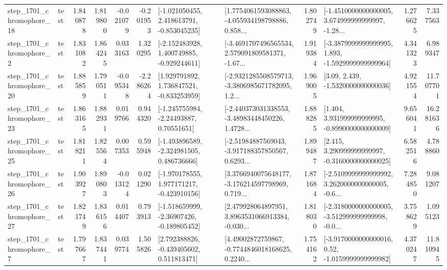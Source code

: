 \begin{tabular}{llrrrrllrlrr}
 step\_1701\_chromophore\_18 &      test &      1.840878 &    1.819800 &     -0.021079 & -0.201953 &   [-1.021050455, 2.418613791, -0.853045235] &  [1.7754061593088863, -4.055934198798886, 0.858... &       1.802749 &  [-1.4510000000000005, 3.674999999999997, -1.28... &            1.276625 &          7.337563 \\
  step\_1701\_chromophore\_2 &      test &      1.831082 &    1.864245 &      0.033163 &  1.320295 &   [-2.152483928, 1.400749885, -0.929244611] &  [-3.4691707496565534, 2.579091809581371, -1.67... &       1.919384 &  [-3.3879999999999995, 1.893, -1.5929999999999964] &            4.341323 &          6.989347 \\
 step\_1701\_chromophore\_20 &      test &      1.885859 &    1.790511 &     -0.095348 & -2.286264 &    [1.929791892, 1.736847521, -0.833253959] &  [-2.9321285508579713, -3.3806985671782095, 1.2... &       1.969005 &                 [3.09, 2.439, -1.5320000000000036] &            4.921554 &         11.707701 \\
 step\_1701\_chromophore\_23 &      test &      1.863165 &    1.882931 &      0.019766 &  0.944320 &     [-1.245755984, -2.24493887, 0.70551651] &  [-2.440373031338553, -3.48983448450226, 1.4728... &       1.888285 &    [1.404, 3.931999999999995, -0.8990000000000009] &            9.656041 &         16.281636 \\
 step\_1701\_chromophore\_25 &      test &      1.818211 &    1.825564 &      0.007353 &  0.595948 &   [-1.493896589, -2.324981505, 0.486736666] &  [-2.51984887569043, -3.917188357850567, 0.6293... &       1.899487 &    [2.415, 3.290999999999997, -0.3160000000000025] &            6.582516 &          4.788860 \\
 step\_1701\_chromophore\_26 &      test &      1.903927 &    1.890803 &     -0.013124 &  0.021290 &   [-1.970178555, 1.977171217, -0.423910156] &  [3.3766940075648177, -3.176214597798969, 0.719... &       1.871684 &  [-2.5109999999999992, 3.2620000000000005, -0.6... &            7.284850 &          9.081207 \\
 step\_1701\_chromophore\_27 &      test &      1.821749 &    1.836156 &      0.014407 &  0.793913 &   [-1.518659999, -2.36907426, -0.189805452] &  [2.479928064897951, 3.8963531066913384, -0.030... &       1.818030 &  [-2.3180000000000005, -3.512999999999998, -0.0... &            3.758629 &          1.095123 \\
  step\_1701\_chromophore\_7 &      test &      1.797667 &    1.837441 &      0.039774 &  1.505826 &    [2.792388826, -0.439405602, 0.511813471] &  [4.49002872759867, -0.7744846018168625, 0.2240... &       1.754162 &   [-3.9170000000000016, 0.52, -1.0159999999999982] &            4.370247 &         11.810945 \\

\end{tabular}

